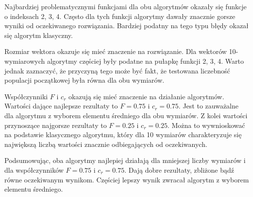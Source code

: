 \documentclass[a4paper]{article}
\begin{document}
Najbardziej problematycznymi funkcjami dla obu algorytmów okazały się funkcje o indeksach 2, 3, 4. Często dla tych funkcji algorytmy dawały znacznie gorsze wyniki od oczekiwanego rozwiązania. Bardziej podatny na tego typu błędy okazał się algorytm klasyczny. 

Rozmiar wektora okazuje się mieć znaczenie na rozwiązanie. Dla wektorów 10-wymiarowych algorytmy częściej były podatne na pułapkę funkcji 2, 3, 4. Warto jednak zaznaczyć, że przyczyną tego może być fakt, że testowana liczebność populacji początkowej była równa dla obu wymiarów. 

Współczynniki $F$ i $c_r$ okazują się mieć znaczenie na działanie algorytmów. Wartości dające najlepsze rezultaty to $F=0.75$ i $c_r=0.75$. Jest to zauważalne dla algorytmu z wyborem elementu średniego dla obu wymiarów. Z kolei wartości przynoszące najgorsze rezultaty to $F=0.25$ i $c_r=0.25$. Można to wywnioskować na podstawie klasycznego algorytmu, który dla 10 wymiarów charakteryzuje się największą liczbą wartości znacznie odbiegających od oczekiwanych.

Podsumowując, oba algorytmy najlepiej działają dla mniejszej liczby wymiarów i dla współczynników $F=0.75$ i $c_r=0.75$. Dają dobre rezultaty, zbliżone bądź równe oczekiwanym wynikom. Częściej lepszy wynik zwracał algorytm z wyborem elementu średniego.
\end{document}
